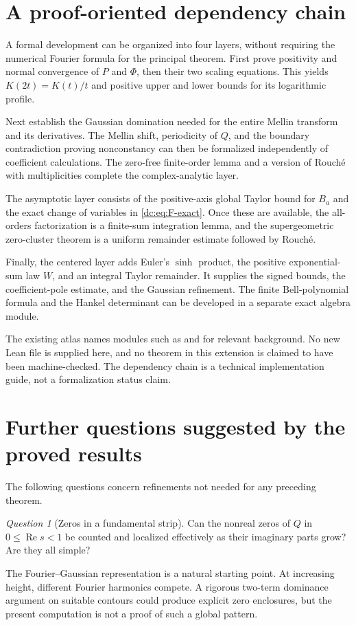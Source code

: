 \documentclass[11pt,a4paper,oneside,openany]{book}
\numberwithin{equation}{chapter}
\theoremstyle{definition}
\theoremstyle{remark}
\newtheorem{question}[theorem]{Question}
\DeclareMathOperator{\Rea}{Re}
\begin{document}
\section{A proof-oriented dependency chain}
A formal development can be organized into four layers, without
requiring the numerical Fourier formula for the principal theorem.
First prove positivity and normal convergence of $P$ and $\Phi$,
then their two scaling equations. This yields $K(2t)=K(t)/t$ and
positive upper and lower bounds for its logarithmic profile.

Next establish the Gaussian domination needed for the entire Mellin
transform and its derivatives. The Mellin shift, periodicity of $Q$,
and the boundary contradiction proving nonconstancy can then be
formalized independently of coefficient calculations. The zero-free
finite-order lemma and a version of Rouch\'e with multiplicities
complete the complex-analytic layer.

The asymptotic layer consists of the positive-axis global Taylor
bound for $B_a$ and the exact change of variables in
\cref{dc:eq:F-exact}. Once these are available, the all-orders
factorization is a finite-sum integration lemma, and the
supergeometric zero-cluster theorem is a uniform remainder estimate
followed by Rouch\'e.

Finally, the centered layer adds Euler's $\sinh$ product, the
positive exponential-sum law $W$, and an integral Taylor remainder.
It supplies the signed bounds, the coefficient-pole estimate, and
the Gaussian refinement. The finite Bell-polynomial formula and the
Hankel determinant can be developed in a separate exact algebra
module.

The existing atlas names modules such as
 and
 for relevant background.
No new Lean file is supplied here, and no theorem in this extension
is claimed to have been machine-checked. The dependency chain is a
technical implementation guide, not a formalization status claim.
\section{Further questions suggested by the proved results}
\label{dc:sec:questions}
The following questions concern refinements not needed for any
preceding theorem.

\begin{question}[Zeros in a fundamental strip]
Can the nonreal zeros of $Q$ in $0\le\Rea s<1$ be counted and
localized effectively as their imaginary parts grow? Are they all
simple?
\end{question}
The Fourier--Gaussian representation is a natural starting point.
At increasing height, different Fourier harmonics compete. A
rigorous two-term dominance argument on suitable contours could
produce explicit zero enclosures, but the present computation is
not a proof of such a global pattern.
\end{document}
